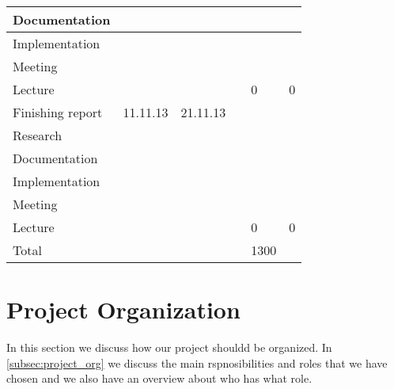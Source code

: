 \documentclass{report}
\begin{document}
\begin{tabular}{| l | l | l | l | p{1.25 cm} | p{1.25 cm}|}
Documentation &  &   &  &  &  \\ \hline
Implementation &  &   &  &   &  \\ \hline
Meeting &  &   &  &   &  \\ \hline
Lecture &  &   &  &  0 & 0 \\ \hline
Finishing report & 11.11.13  & 21.11.13 &  &  &\\ \hline
Research &  &   &  &  &  \\ \hline
Documentation &  &   &  &  &  \\ \hline
Implementation &  &   &  &   &  \\ \hline
Meeting &  &   &  &   &  \\ \hline
Lecture &  &   &  &  0 & 0 \\ \hline
Total &  &   &  &  1300 &  \\ \hline
\end{tabular}

\section{Project Organization} \label{sec:project_organization}
In this section we discuss how our project shouldd be organized. In \ref{subsec:project_org} we discuss the main rspnosibilities and roles that we have chosen and we also have an overview about who has what role.
\end{document}
